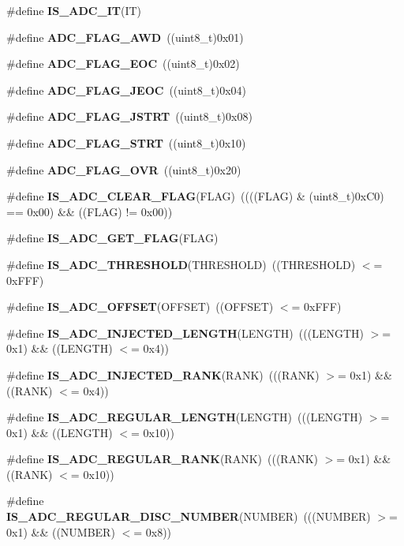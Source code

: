 \begin{DoxyCompactItemize}
\#define \textbf{ I\+S\+\_\+\+A\+D\+C\+\_\+\+IT}(IT)
\item 
\#define \textbf{ A\+D\+C\+\_\+\+F\+L\+A\+G\+\_\+\+A\+WD}~((uint8\+\_\+t)0x01)
\item 
\#define \textbf{ A\+D\+C\+\_\+\+F\+L\+A\+G\+\_\+\+E\+OC}~((uint8\+\_\+t)0x02)
\item 
\#define \textbf{ A\+D\+C\+\_\+\+F\+L\+A\+G\+\_\+\+J\+E\+OC}~((uint8\+\_\+t)0x04)
\item 
\#define \textbf{ A\+D\+C\+\_\+\+F\+L\+A\+G\+\_\+\+J\+S\+T\+RT}~((uint8\+\_\+t)0x08)
\item 
\#define \textbf{ A\+D\+C\+\_\+\+F\+L\+A\+G\+\_\+\+S\+T\+RT}~((uint8\+\_\+t)0x10)
\item 
\#define \textbf{ A\+D\+C\+\_\+\+F\+L\+A\+G\+\_\+\+O\+VR}~((uint8\+\_\+t)0x20)
\item 
\#define \textbf{ I\+S\+\_\+\+A\+D\+C\+\_\+\+C\+L\+E\+A\+R\+\_\+\+F\+L\+AG}(F\+L\+AG)~((((F\+L\+AG) \& (uint8\+\_\+t)0x\+C0) == 0x00) \&\& ((\+F\+L\+A\+G) != 0x00))
\item 
\#define \textbf{ I\+S\+\_\+\+A\+D\+C\+\_\+\+G\+E\+T\+\_\+\+F\+L\+AG}(F\+L\+AG)
\item 
\#define \textbf{ I\+S\+\_\+\+A\+D\+C\+\_\+\+T\+H\+R\+E\+S\+H\+O\+LD}(T\+H\+R\+E\+S\+H\+O\+LD)~((T\+H\+R\+E\+S\+H\+O\+LD) $<$= 0x\+F\+F\+F)
\item 
\#define \textbf{ I\+S\+\_\+\+A\+D\+C\+\_\+\+O\+F\+F\+S\+ET}(O\+F\+F\+S\+ET)~((O\+F\+F\+S\+ET) $<$= 0x\+F\+F\+F)
\item 
\#define \textbf{ I\+S\+\_\+\+A\+D\+C\+\_\+\+I\+N\+J\+E\+C\+T\+E\+D\+\_\+\+L\+E\+N\+G\+TH}(L\+E\+N\+G\+TH)~(((L\+E\+N\+G\+TH) $>$= 0x1) \&\& ((\+L\+E\+N\+G\+T\+H) $<$= 0x4))
\item 
\#define \textbf{ I\+S\+\_\+\+A\+D\+C\+\_\+\+I\+N\+J\+E\+C\+T\+E\+D\+\_\+\+R\+A\+NK}(R\+A\+NK)~(((R\+A\+NK) $>$= 0x1) \&\& ((\+R\+A\+N\+K) $<$= 0x4))
\item 
\#define \textbf{ I\+S\+\_\+\+A\+D\+C\+\_\+\+R\+E\+G\+U\+L\+A\+R\+\_\+\+L\+E\+N\+G\+TH}(L\+E\+N\+G\+TH)~(((L\+E\+N\+G\+TH) $>$= 0x1) \&\& ((\+L\+E\+N\+G\+T\+H) $<$= 0x10))
\item 
\#define \textbf{ I\+S\+\_\+\+A\+D\+C\+\_\+\+R\+E\+G\+U\+L\+A\+R\+\_\+\+R\+A\+NK}(R\+A\+NK)~(((R\+A\+NK) $>$= 0x1) \&\& ((\+R\+A\+N\+K) $<$= 0x10))
\item 
\#define \textbf{ I\+S\+\_\+\+A\+D\+C\+\_\+\+R\+E\+G\+U\+L\+A\+R\+\_\+\+D\+I\+S\+C\+\_\+\+N\+U\+M\+B\+ER}(N\+U\+M\+B\+ER)~(((N\+U\+M\+B\+ER) $>$= 0x1) \&\& ((\+N\+U\+M\+B\+E\+R) $<$= 0x8))
\end{DoxyCompactItemize}
